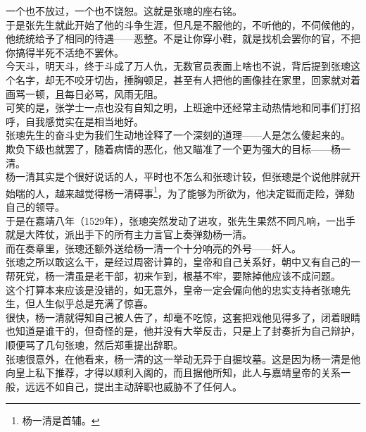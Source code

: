 \begin{multicols}{\theparacolNo}
一个也不放过，一个也不饶恕。这就是张璁的座右铭。\\

于是张先生就此开始了他的斗争生涯，但凡是不服他的，不听他的，不伺候他的，他统统给予了相同的待遇——恶整。不是让你穿小鞋，就是找机会罢你的官，不把你搞得半死不活绝不罢休。\\

今天斗，明天斗，终于斗成了万人仇，无数官员表面上啥也不说，背后提到张璁这个名字，却无不咬牙切齿，捶胸顿足，甚至有人把他的画像挂在家里，回家就对着画骂一顿，且每日必骂，风雨无阻。\\

可笑的是，张学士一点也没有自知之明，上班途中还经常主动热情地和同事们打招呼，自我感觉实在是相当地好。\\

张璁先生的奋斗史为我们生动地诠释了一个深刻的道理——人是怎么傻起来的。\\

欺负下级也就罢了，随着病情的恶化，他又瞄准了一个更为强大的目标——杨一清。\\

杨一清其实是个很好说话的人，平时也不怎么和张璁计较，但张璁是个说他胖就开始喘的人，越来越觉得杨一清碍事\footnote{杨一清是首辅。}，为了能够为所欲为，他决定铤而走险，弹劾自己的领导。\\

于是在嘉靖八年（1529年），张璁突然发动了进攻，张先生果然不同凡响，一出手就是大阵仗，派出手下的所有主力言官上奏弹劾杨一清。\\

而在奏章里，张璁还额外送给杨一清一个十分响亮的外号——奸人。\\

张璁之所以敢这么干，是经过周密计算的，皇帝和自己关系好，朝中又有自己的一帮死党，杨一清虽是老干部，初来乍到，根基不牢，要除掉他应该不成问题。\\

这个打算本来应该是没错的，如无意外，皇帝一定会偏向他的忠实支持者张璁先生，但人生似乎总是充满了惊喜。\\

很快，杨一清就得知自己被人告了，却毫不吃惊，这套把戏他见得多了，闭着眼睛也知道是谁干的，但奇怪的是，他并没有大举反击，只是上了封奏折为自己辩护，顺便骂了几句张璁，然后郑重提出辞职。\\

张璁很意外，在他看来，杨一清的这一举动无异于自掘坟墓。这是因为杨一清是他向皇上私下推荐，才得以顺利入阁的，而且据他所知，此人与嘉靖皇帝的关系一般，远远不如自己，提出主动辞职也威胁不了任何人。\\


\end{multicols}
